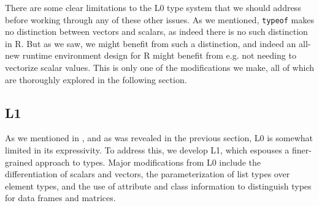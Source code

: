 \documentclass[acmsmall,10pt,review,anonymous]{acmart}\settopmatter{printfolios=true,printccs=false,printacmref=false}
\newcommand{\code}[1]{\lstinline|#1|\xspace}
\begin{document}
%

There are some clear limitations to the L0 type system that we should
address before working through any of these other issues. As we mentioned,
\code{typeof} makes no distinction between vectors and scalars, as indeed
there is no such distinction in R.  But as we saw, we might benefit from
such a distinction, and indeed an all-new runtime environment design for R
might benefit from e.g. not needing to vectorize scalar values.  This is only one
of the modifications we make, all of which are thoroughly explored in
the following section.
%
%
%
%
\subsection{L1}

As we mentioned in , and as was revealed in the previous section,
L0 is somewhat limited in its expressivity. To address this, we develop L1, which espouses
a finer-grained approach to types. Major modifications from L0 include the differentiation of
scalars and vectors, the parameterization of list types over element types, and the use of
attribute and class information to distinguish types for data frames and matrices.
\end{document}
